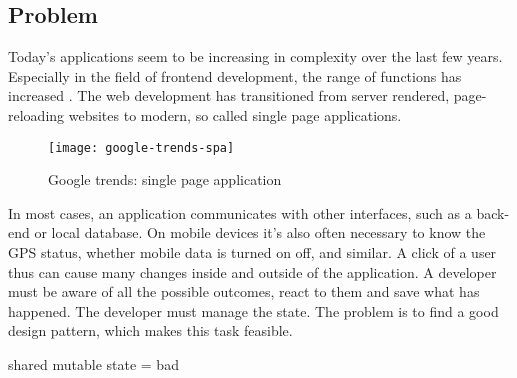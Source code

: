 \subsection{Problem}
\label{subsec:problem}

Today's applications seem to be increasing in complexity over the last few years. 
Especially in the field of frontend development, the range of functions has increased \cite{kevin2018}.
The web development has transitioned from server rendered, page-reloading websites to modern, so called single page applications.

\begin{figure}[h]
\texttt{[image: google-trends-spa]}
\centering
\caption{Google trends: single page application}
\label{fig:google-trends-spa}
\end{figure}

In most cases, an application communicates with other interfaces, such as a back-end or local database.
On mobile devices it's also often necessary to know the GPS status, whether mobile data is turned on off, and similar. 
A click of a user thus can cause many changes inside and outside of the application.
A developer must be aware of all the possible outcomes,  react to them and save what has happened.
The developer must manage the state. The problem is to find a good design pattern, which makes this task feasible. 


shared mutable state = bad
